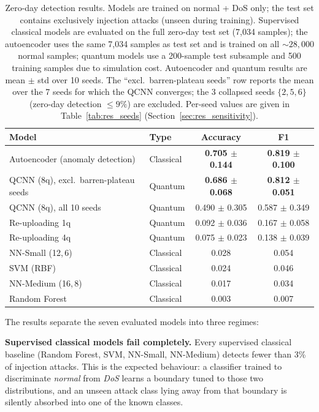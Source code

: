 \begin{table}[ht]
\centering
\begin{tabular}{llcc}
    \toprule
    \textbf{Model} & \textbf{Type} & \textbf{Accuracy} & \textbf{F1} \\
    \midrule
    Autoencoder (anomaly detection)        & Classical & \textbf{0.705 $\pm$ 0.144} & \textbf{0.819 $\pm$ 0.100} \\
    QCNN (8q), excl.\ barren-plateau seeds & Quantum   & \textbf{0.686 $\pm$ 0.068} & \textbf{0.812 $\pm$ 0.051} \\
    QCNN (8q), all 10 seeds                & Quantum   & 0.490 $\pm$ 0.305          & 0.587 $\pm$ 0.349 \\
    Re-uploading 1q                        & Quantum   & 0.092 $\pm$ 0.036          & 0.167 $\pm$ 0.058 \\
    Re-uploading 4q                        & Quantum   & 0.075 $\pm$ 0.023          & 0.138 $\pm$ 0.039 \\
    \midrule
    NN-Small (12,\,6)      & Classical & 0.028 & 0.054 \\
    SVM (RBF)              & Classical & 0.024 & 0.046 \\
    NN-Medium (16,\,8)     & Classical & 0.017 & 0.034 \\
    Random Forest          & Classical & 0.003 & 0.007 \\
    \bottomrule
\end{tabular}
\caption{Zero-day detection results. Models are trained on normal + DoS only; the test set contains exclusively injection attacks (unseen during training). Supervised classical models are evaluated on the full zero-day test set (7,034 samples); the autoencoder uses the same 7,034 samples as test set and is trained on all ${\sim}28{,}000$ normal samples; quantum models use a 200-sample test subsample and 500 training samples due to simulation cost. Autoencoder and quantum results are mean $\pm$ std over 10 seeds. The ``excl.\ barren-plateau seeds'' row reports the mean over the 7 seeds for which the QCNN converges; the 3 collapsed seeds $\{2, 5, 6\}$ (zero-day detection $\leq 9\%$) are excluded. Per-seed values are given in Table~\ref{tab:res_seeds} (Section~\ref{sec:res_sensitivity}).}
\label{tab:res_zeroday}
\end{table}

The results separate the seven evaluated models into three regimes:

\textbf{Supervised classical models fail completely.} Every supervised classical baseline (Random Forest, SVM, NN-Small, NN-Medium) detects fewer than 3\% of injection attacks. This is the expected behaviour: a classifier trained to discriminate \emph{normal} from \emph{DoS} learns a boundary tuned to those two distributions, and an unseen attack class lying away from that boundary is silently absorbed into one of the known classes.

